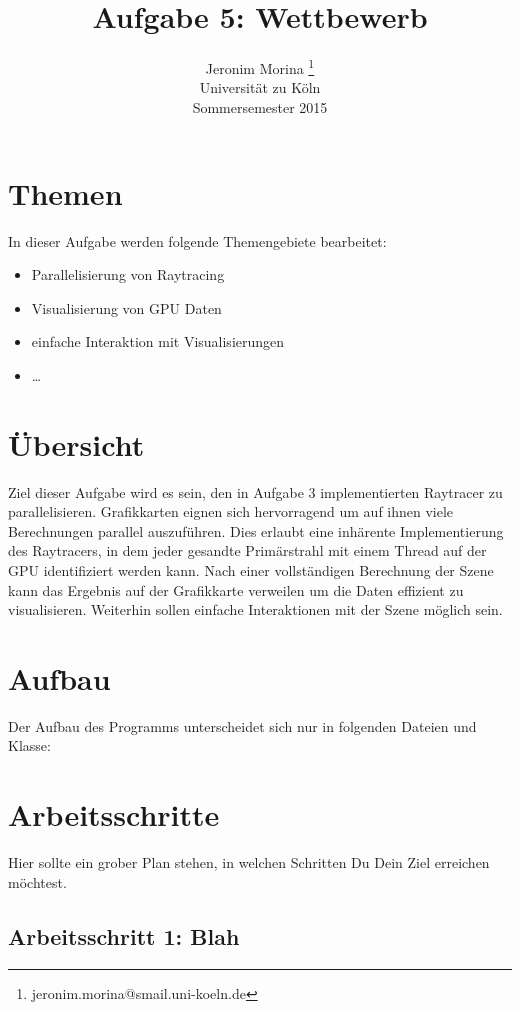 \documentclass[10pt]{article}
\title{Aufgabe 5: Wettbewerb}
\author{Jeronim Morina \thanks{jeronim.morina@smail.uni-koeln.de}\\
        \scriptsize Universität zu Köln\\
        Sommersemester 2015
}
\begin{document}
\maketitle

\begin{multicols}{2}

\section{Themen}
In dieser Aufgabe werden folgende Themengebiete bearbeitet:
\begin{itemize}
    \item Parallelisierung von Raytracing
    \item Visualisierung von GPU Daten
    \item einfache Interaktion mit Visualisierungen
    \item \dots
\end{itemize}


\section{Übersicht}

Ziel dieser Aufgabe wird es sein, den in Aufgabe 3 implementierten Raytracer zu parallelisieren. Grafikkarten eignen sich hervorragend um auf ihnen viele Berechnungen parallel auszuführen. Dies erlaubt eine inhärente Implementierung des Raytracers, in dem jeder gesandte Primärstrahl mit einem Thread auf der GPU identifiziert werden kann. Nach einer vollständigen Berechnung der Szene kann das Ergebnis auf der Grafikkarte verweilen um die Daten effizient zu visualisieren. Weiterhin sollen einfache Interaktionen mit der Szene möglich sein. 

\section{Aufbau} 

Der Aufbau des Programms unterscheidet sich nur in folgenden Dateien und Klasse:


\section{Arbeitsschritte}
Hier sollte ein grober Plan stehen, in welchen Schritten Du Dein Ziel
erreichen möchtest.
\subsection{Arbeitsschritt 1: Blah}

\end{multicols}
\end{document}
